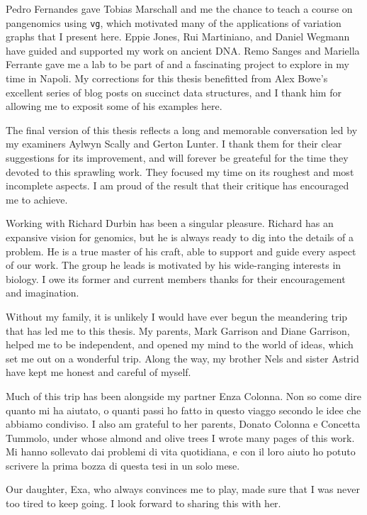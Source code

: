 \begin{acknowledgements}
  Pedro Fernandes gave Tobias Marschall and me the chance to teach a course on pangenomics using {\tt vg}, which motivated many of the applications of variation graphs that I present here.
  Eppie Jones, Rui Martiniano, and Daniel Wegmann have guided and supported my work on ancient DNA.
  Remo Sanges and Mariella Ferrante gave me a lab to be part of and a fascinating project to explore in my time in Napoli.
  My corrections for this thesis benefitted from Alex Bowe's excellent series of blog posts on succinct data structures, and I thank him for allowing me to exposit some of his examples here.

  The final version of this thesis reflects a long and memorable conversation led by my examiners Aylwyn Scally and Gerton Lunter.
  I thank them for their clear suggestions for its improvement, and will forever be greateful for the time they devoted to this sprawling work.
  They focused my time on its roughest and most incomplete aspects.
  I am proud of the result that their critique has encouraged me to achieve.
  
  Working with Richard Durbin has been a singular pleasure.
  Richard has an expansive vision for genomics, but he is always ready to dig into the details of a problem.
  He is a true master of his craft, able to support and guide every aspect of our work.
  The group he leads is motivated by his wide-ranging interests in biology.
  I owe its former and current members thanks for their encouragement and imagination.

  Without my family, it is unlikely I would have ever begun the meandering trip that has led me to this thesis.
  My parents, Mark Garrison and Diane Garrison, helped me to be independent, and opened my mind to the world of ideas, which set me out on a wonderful trip.
  Along the way, my brother Nels and sister Astrid have kept me honest and careful of myself.

  Much of this trip has been alongside my partner Enza Colonna.
  Non so come dire quanto mi ha aiutato, o quanti passi ho fatto in questo viaggo secondo le idee che abbiamo condiviso.
  I also am grateful to her parents, Donato Colonna e Concetta Tummolo, under whose almond and olive trees I wrote many pages of this work.
  Mi hanno sollevato dai problemi di vita quotidiana, e con il loro aiuto ho potuto scrivere la prima bozza di questa tesi in un solo mese.
  
  Our daughter, Exa, who always convinces me to play, made sure that I was never too tired to keep going.
  I look forward to sharing this with her.



\end{acknowledgements}
